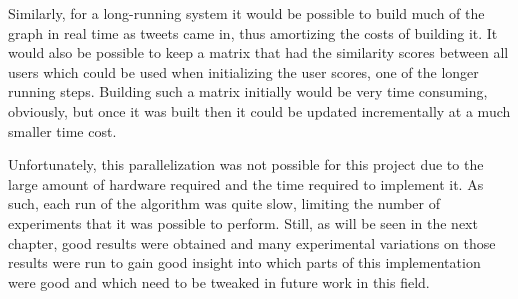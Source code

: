Similarly, for a long-running system it would be possible to build much of the graph in real time as tweets came in, thus amortizing the costs of building it. It would also be possible to keep a matrix that had the similarity scores between all users which could be used when initializing the user scores, one of the longer running steps. Building such a matrix initially would be very time consuming, obviously, but once it was built then it could be updated incrementally at a much smaller time cost.

Unfortunately, this parallelization was not possible for this project due to the large amount of hardware required and the time required to implement it. As such, each run of the algorithm was quite slow, limiting the number of experiments that it was possible to perform. Still, as will be seen in the next chapter, good results were obtained and many experimental variations on those results were run to gain good insight into which parts of this implementation were good and which need to be tweaked in future work in this field.





